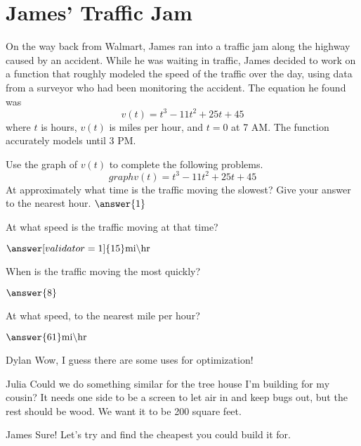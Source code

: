 \documentclass{ximera}
\begin{document}
\section{James' Traffic Jam}
On the way back from Walmart, James ran into a traffic jam along the highway caused by an accident. While he was waiting in traffic, James decided to work on a function that roughly modeled the speed of the traffic over the day, using data from a surveyor who had been monitoring the accident. The equation he found was $$v(t)=t^3-11t^2+25t+45$$ where $t$ is hours, $v(t)$ is miles per hour, and $t = 0$ at 7 AM. The function accurately models until 3 PM.
\begin{question}
Use the graph of $v(t)$ to complete the following problems.
\[
graph{v(t)=t^3-11t^2+25t+45}
\]
At approximately what time is the traffic moving the slowest? Give your answer to the nearest hour.
$\answer{1}$
\begin{multipleChoice}
\end{multipleChoice}

At what speed is the traffic moving at that time?

$\answer[validator=1]{15} \text{mi} \backslash \text{hr}$

When is the traffic moving the most quickly?

$\answer{8}$\begin{multipleChoice}
\end{multipleChoice}

At what speed, to the nearest mile per hour?

$\answer{61} \text{mi} \backslash \text{hr}$

\end{question}
\begin{dialogue}
\item[Dylan] Wow, I guess there are some uses for optimization!
\item[Julia] Could we do something similar for the tree house I'm building for my cousin? It needs one side to be a screen to let air in and keep bugs out, but the rest should be wood. We want it to be 200 square feet.
\item[James] Sure! Let's try and find the cheapest you could build it for.
\end{dialogue}
\end{document}
